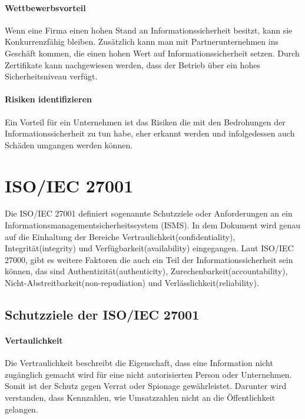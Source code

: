 \paragraph{Wettbewerbsvorteil}
Wenn eine Firma einen hohen Stand an Informationssicherheit besitzt, kann sie Konkurrenzfähig bleiben. Zusätzlich kann man mit Partnerunternehmen ins Geschäft kommen, die einen hohen Wert auf Informationssicherheit setzen. Durch Zertifikate kann nachgewiesen werden, dass der Betrieb über ein hohes Sicherheitsniveau verfügt.

\paragraph{Risiken identifizieren}
Ein Vorteil für ein Unternehmen ist das Risiken die mit den Bedrohungen der Informationssicherheit zu tun habe, eher erkannt werden und infolgedessen auch Schäden umgangen werden können.

\section{ISO/IEC 27001}
Die ISO/IEC 27001 definiert sogenannte Schutzziele oder Anforderungen an ein Informationsmanagementsicherheitssystem (ISMS). In dem Dokument wird genau auf die Einhaltung der Bereiche Vertraulichkeit(confidentiality), Integrität(integrity) und Verfügbarkeit(availability) eingegangen. Laut ISO/IEC 27000, gibt es weitere Faktoren die auch ein Teil der Informationssicherheit sein können, das sind Authentizität(authenticity), Zurechenbarkeit(accountability), Nicht-Abstreitbarkeit(non-repudiation) und Verlässlichkeit(reliability).

\subsection{Schutzziele der ISO/IEC 27001}
\paragraph{Vertaulichkeit}
Die Vertraulichkeit beschreibt die Eigenschaft, dass eine Information nicht zugänglich gemacht wird für eine nicht autorisierten Person oder Unternehmen. Somit ist der Schutz gegen Verrat oder Spionage gewährleistet. Darunter wird verstanden, dass Kennzahlen, wie Umsatzzahlen nicht an die Öffentlichkeit gelangen. 


